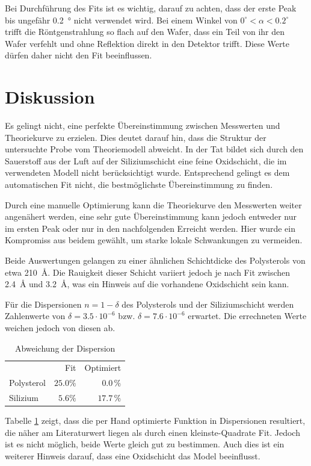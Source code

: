 Bei Durchführung des Fits ist es wichtig, darauf zu achten, dass der erste Peak bis ungefähr \SI{0.2}{\degree} nicht verwendet wird. Bei einem Winkel von $0^\circ < \alpha < 0.2^\circ$ trifft die Röntgenstrahlung so flach auf den Wafer, dass ein Teil von ihr den Wafer verfehlt und ohne Reflektion direkt in den Detektor trifft. Diese Werte dürfen daher nicht den Fit beeinflussen.

\section{Diskussion}
Es gelingt nicht, eine perfekte Übereinstimmung zwischen Messwerten und Theoriekurve zu erzielen.
Dies deutet darauf hin, dass die Struktur der untersuchte Probe vom Theoriemodell abweicht. In der Tat bildet sich durch den Sauerstoff aus der Luft auf der Siliziumschicht eine feine Oxidschicht, die im verwendeten Modell nicht berücksichtigt wurde.
Entsprechend gelingt es dem automatischen Fit nicht, die bestmöglichste Übereinstimmung zu finden.

Durch eine manuelle Optimierung kann die Theoriekurve den Messwerten weiter angenähert werden, eine sehr gute Übereinstimmung kann jedoch entweder nur im ersten Peak oder nur in den nachfolgenden Erreicht werden. Hier wurde ein Kompromiss aus beidem gewählt, um starke lokale Schwankungen zu vermeiden.

Beide Auswertungen gelangen zu einer ähnlichen Schichtdicke des Polysterols von etwa \SI{210}{\angstrom}.
Die Rauigkeit dieser Schicht variiert jedoch je nach Fit zwischen \SI{2.4}{\angstrom} und \SI{3.2}{\angstrom}, was ein Hinweis auf die vorhandene Oxidschicht sein kann.

Für die Dispersionen $n = 1 -\delta$ des Polysterols und der Siliziumschicht werden Zahlenwerte von $\delta = 3.5\cdot10^{-6}$ bzw. $\delta = 7.6\cdot10^{-6}$ erwartet\cite{Anl}. Die errechneten Werte weichen jedoch von diesen ab.
\begin{table}[H]
	\begin{tabular}{lrr}
		& Fit & Optimiert\\
		\cmidrule{2-3}
		Polysterol & $25.0\%$ & $0.0\,\%$\\
		Silizium & $5.6\%$ & $17.7\,\%$
	\end{tabular}
	\caption{Abweichung der Dispersion}
	\label{tab}
\end{table}
Tabelle \ref{tab} zeigt, dass die per Hand optimierte Funktion in Dispersionen resultiert, die näher am Literaturwert liegen als durch einen kleinste-Quadrate Fit. Jedoch ist es nicht möglich, beide Werte gleich gut zu bestimmen. Auch dies ist ein weiterer Hinweis darauf, dass eine Oxidschicht das Model beeinflusst.


